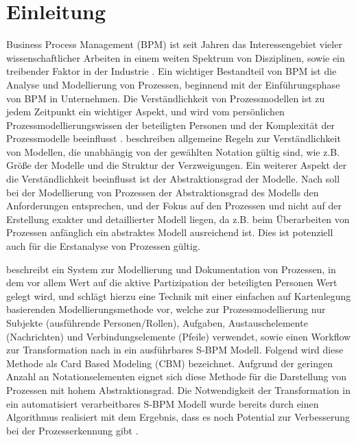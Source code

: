 %
%
% 
% 
% 

\chapter{Einleitung}
\label{cha:einleitung}
Business Process Management (BPM) ist seit Jahren das Interessengebiet vieler wissenschaftlicher Arbeiten in einem weiten Spektrum von Disziplinen, sowie ein treibender Faktor in der Industrie \cite{vanderAalst2016}. Ein wichtiger Bestandteil von BPM ist die Analyse und Modellierung von Prozessen, beginnend mit der Einführungsphase von BPM in Unternehmen. Die Verständlichkeit von Prozessmodellen ist zu jedem Zeitpunkt ein wichtiger Aspekt, und wird vom persönlichen Prozessmodellierungswissen der beteiligten Personen und der Komplexität der Prozessmodelle beeinflusst \cite{reijers_study_2011}. \citet{MENDLING2010127} beschreiben allgemeine Regeln zur Verständlichkeit von Modellen, die unabhängig von der gewählten Notation gültig sind, wie z.B. Größe der Modelle und die Struktur der Verzweigungen. Ein weiterer Aspekt der die Verständlichkeit beeinflusst ist der Abstraktionsgrad der Modelle. Nach \citet{vanderAalst2016} soll bei der Modellierung von Prozessen der Abstraktionsgrad des Modells den Anforderungen entsprechen, und der Fokus auf den Prozessen und nicht auf der Erstellung exakter und detaillierter Modell liegen, da z.B. beim Überarbeiten von Prozessen anfänglich ein abstraktes Modell ausreichend ist. Dies ist potenziell auch für die Erstanalyse von Prozessen gültig. 

\citet{Oppl:2015:ASB:2723839.2723841} beschreibt ein System zur Modellierung und Dokumentation von Prozessen, in dem vor allem Wert auf die aktive Partizipation der beteiligten Personen Wert gelegt wird, und schlägt hierzu eine Technik mit einer einfachen auf Kartenlegung basierenden Modellierungsmethode vor, welche zur Prozessmodellierung nur Subjekte (ausführende Personen/Rollen), Aufgaben, Austauschelemente (Nachrichten) und Verbindungselemente (Pfeile) verwendet, sowie einen Workflow zur Transformation nach in ein ausführbares S-BPM Modell. Folgend wird diese Methode als Card Based Modeling (CBM) bezeichnet. Aufgrund der geringen Anzahl an Notationselementen eignet sich diese Methode für die Darstellung von Prozessen mit hohem Abstraktionsgrad. Die Notwendigkeit der Transformation in ein automatisiert verarbeitbares S-BPM Modell wurde bereits durch einen Algorithmus realisiert mit dem Ergebnis, dass es noch Potential zur Verbesserung bei der Prozesserkennung gibt \cite{max}. 

